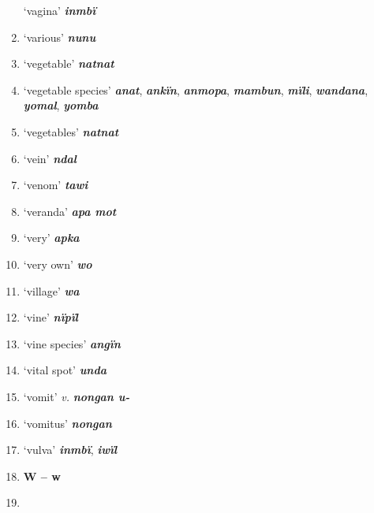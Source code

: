 \begin{enumerate}[noitemsep, label={}, align=left, widest=190, labelsep=1ex,leftmargin=*,itemindent=-10pt]
‘vagina’ \textbf{\textit{inmbï}} \item
‘various’ \textbf{\textit{nunu}} \item
‘vegetable’ \textbf{\textit{natnat}} \item
‘vegetable species’ \textbf{\textit{anat}}, \textbf{\textit{ankïn}}, \textbf{\textit{anmopa}}, \textbf{\textit{mambun}}, \textbf{\textit{mïli}}, \textbf{\textit{wandana}}, \textbf{\textit{yomal}}, \textbf{\textit{yomba}} \item
‘vegetables’ \textbf{\textit{natnat}} \item
‘vein’ \textbf{\textit{ndal}} \item
‘venom’ \textbf{\textit{tawi}} \item
‘veranda’ \textbf{\textit{apa mot}} \item
‘very’ \textbf{\textit{apka}} \item
‘very own’ \textbf{\textit{wo}} \item
‘village’ \textbf{\textit{wa}} \item
‘vine’ \textbf{\textit{nïpïl}} \item
‘vine species’ \textbf{\textit{angïn}} \item
‘vital spot’ \textbf{\textit{unda}} \item
‘vomit’ \textit{v.} \textbf{\textit{nongan u-}} \item
‘vomitus’ \textbf{\textit{nongan}} \item
‘vulva’ \textbf{\textit{inmbï}}, \textbf{\textit{iwïl}}\\ \item

\noindent \textbf{W – w}\\ \item


\end{enumerate}
